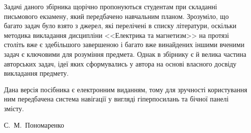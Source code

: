 Задачі даного збірника щорічно пропонуються студентам при складанні письмового екзамену, який передбачено навчальним планом. Зрозуміло, що багато задач було взято з джерел, які перелічені в списку літератури, оскільки методика викладання дисципліни <<Електрика та магнетизм>> на протязі століть вже є здебільшого завершеною і багато вже винайдених іншими вченими задач є ключовими для розуміння предмета. Однак в збірнику є й велика частина авторських задач, ідеї яких сформувались у автора на основі власного досвіду викладання предмету.
 
Дана версія посібника є електронним виданням, тому для зручності користування ним передбачена система навігації у вигляді гіперпосилань та бічної панелі змісту.

\vspace*{4em}

\begin{flushright}\Annabelle
	С.~М.~Пономаренко
\end{flushright}
\introfalse





